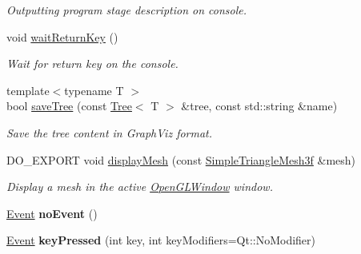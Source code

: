 \begin{DoxyCompactItemize}
\begin{DoxyCompactList}\small\item\em Outputting program stage description on console. \end{DoxyCompactList}\item 
\hypertarget{group___utility_ga553a39cfa65861e30418250dfba7417c}{void \hyperlink{group___utility_ga553a39cfa65861e30418250dfba7417c}{wait\-Return\-Key} ()}\label{group___utility_ga553a39cfa65861e30418250dfba7417c}

\begin{DoxyCompactList}\small\item\em Wait for return key on the console. \end{DoxyCompactList}\item 
\hypertarget{group___tree_ga0fe2d80d493a2cd0387521078c7bb6af}{{\footnotesize template$<$typename T $>$ }\\bool \hyperlink{group___tree_ga0fe2d80d493a2cd0387521078c7bb6af}{save\-Tree} (const \hyperlink{class_d_o_1_1_tree}{Tree}$<$ T $>$ \&tree, const std\-::string \&name)}\label{group___tree_ga0fe2d80d493a2cd0387521078c7bb6af}

\begin{DoxyCompactList}\small\item\em Save the tree content in Graph\-Viz format. \end{DoxyCompactList}\item 
\hypertarget{group___draw3_d_ga07235b9568ca2bcaaa75fcd401e6ded3}{D\-O\-\_\-\-E\-X\-P\-O\-R\-T void \hyperlink{group___draw3_d_ga07235b9568ca2bcaaa75fcd401e6ded3}{display\-Mesh} (const \hyperlink{group___draw3_d_ga4f1ab8c8365dc907bff111a6f87e6141}{Simple\-Triangle\-Mesh3f} \&mesh)}\label{group___draw3_d_ga07235b9568ca2bcaaa75fcd401e6ded3}

\begin{DoxyCompactList}\small\item\em Display a mesh in the active \hyperlink{class_d_o_1_1_open_g_l_window}{Open\-G\-L\-Window} window. \end{DoxyCompactList}\item 
\hypertarget{group___event_ga691df2a744335cf4257816068a74c95d}{\hyperlink{struct_d_o_1_1_event}{Event} {\bfseries no\-Event} ()}\label{group___event_ga691df2a744335cf4257816068a74c95d}

\item 
\hypertarget{group___event_ga653a56731938006a7441685d3751c5c7}{\hyperlink{struct_d_o_1_1_event}{Event} {\bfseries key\-Pressed} (int key, int key\-Modifiers=Qt\-::\-No\-Modifier)}\label{group___event_ga653a56731938006a7441685d3751c5c7}


\end{DoxyCompactItemize}
